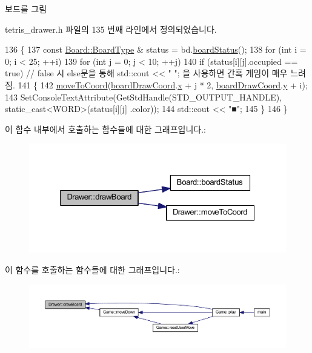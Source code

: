 보드를 그림 



tetris\+\_\+drawer.\+h 파일의 135 번째 라인에서 정의되었습니다.


\begin{DoxyCode}
136     \{
137         \textcolor{keyword}{const} \mbox{\hyperlink{class_board_a84bf794bc185e31e333b78bb003c4bc3}{Board::BoardType}} & status = bd.\mbox{\hyperlink{class_board_ac96b4da16e8dc266b39772f2da3fd7e2}{boardStatus}}();
138         \textcolor{keywordflow}{for} (\textcolor{keywordtype}{int} i = 0; i < 25; ++i)
139             \textcolor{keywordflow}{for} (\textcolor{keywordtype}{int} j = 0; j < 10; ++j)
140                 \textcolor{keywordflow}{if} (status[i][j].occupied == \textcolor{keyword}{true})  \textcolor{comment}{// false 시 else문을 통해 std::cout << "  "; 을 사용하면 간혹 게임이
       매우 느려짐.}
141                 \{
142                     \mbox{\hyperlink{class_drawer_ac1a96e007c07cab2e36a7c78484ee9a6}{moveToCoord}}(\mbox{\hyperlink{tetris__drawer_8h_afe5fa4d0ad1820f448b83de84142af4d}{boardDrawCoord}}.\mbox{\hyperlink{struct_coord_a696eaa744360fc791d0e3b331c549dbe}{x}} + j * 2, 
      \mbox{\hyperlink{tetris__drawer_8h_afe5fa4d0ad1820f448b83de84142af4d}{boardDrawCoord}}.\mbox{\hyperlink{struct_coord_a214166cca70cef7dda9201689c3e81ab}{y}} + i);
143                     SetConsoleTextAttribute(GetStdHandle(STD\_OUTPUT\_HANDLE), static\_cast<WORD>(status[i][j]
      .color));
144                     std::cout << \textcolor{stringliteral}{"■"};
145                 \}
146     \}
\end{DoxyCode}
이 함수 내부에서 호출하는 함수들에 대한 그래프입니다.\+:
\nopagebreak
\begin{figure}[H]
\begin{center}
\leavevmode
\includegraphics[width=325pt]{class_drawer_af26df40487cb2de033887b5342d94b5a_cgraph}
\end{center}
\end{figure}
이 함수를 호출하는 함수들에 대한 그래프입니다.\+:
\nopagebreak
\begin{figure}[H]
\begin{center}
\leavevmode
\includegraphics[width=350pt]{class_drawer_af26df40487cb2de033887b5342d94b5a_icgraph}
\end{center}
\end{figure}
